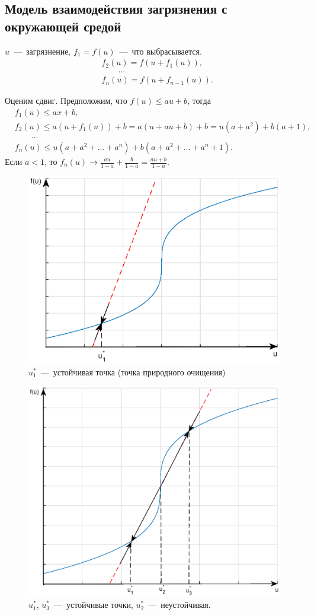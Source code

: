 \subsection*{Модель взаимодействия загрязнения с окружающей средой}
$u$~---~загрязнение, $f_1 = f(u)$~---~что выбрасывается.
\begin{equation*}
\begin{aligned}
&f_2(u) = f(u + f_1(u)),\\
&\qquad \ldots\\
&f_n(u) = f(u + f_{n-1}(u)).
\end{aligned}
\end{equation*}

Оценим сдвиг. Предположим, что $f(u) \leq au + b$, тогда 
\begin{equation*}
\begin{aligned}
&f_1(u) \leq ax + b,\\
&f_2(u) \leq a(u + f_1(u)) + b = a(u + au + b) + b = u(a + a^2) + b(a + 1),\\
&\qquad \ldots\\
&f_n(u) \leq u(a + a^2 + \ldots + a^n) + b(a + a^2 + \ldots + a^n + 1).
\end{aligned}
\end{equation*}
Если $a < 1$, то $f_n(u) \to \frac{au}{1 - a} + \frac{b}{1 - a} = \frac{au + b}{1 - a}$.

\begin{figure}[H]
\begin{center}
\includegraphics[width=0.5\linewidth]{ch1/ch1_fig2.eps}
\caption{$u_1^*$~---~устойчивая точка (точка природного очищения)}
\label{ch1.fig2}
\end{center}
\end{figure}

\begin{figure}[H]
\begin{center}
\includegraphics[width=0.5\linewidth]{ch1/ch1_fig3.eps}
\caption{$u_1^*$, $u_3^*$~---~устойчивые точки, $u_2^*$~---~неустойчивая.}
\label{ch1.fig3}
\end{center}
\end{figure}

